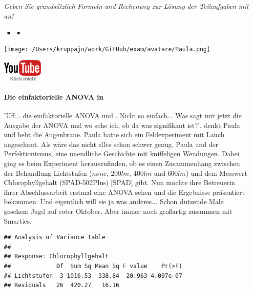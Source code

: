 \documentclass[a4paper, 9pt]{scrartcl}\usepackage[]{graphicx}\usepackage[]{xcolor}
\makeatletter
\newenvironment{kframe}{%
 \def\at@end@of@kframe{}%
 \ifinner\ifhmode%
  \def\at@end@of@kframe{\end{minipage}}%
  \begin{minipage}{\columnwidth}%
 \fi\fi%
 \def\FrameCommand##1{\hskip\@totalleftmargin \hskip-\fboxsep
 \colorbox{shadecolor}{##1}\hskip-\fboxsep
     \hskip-\linewidth \hskip-\@totalleftmargin \hskip\columnwidth}%
 \MakeFramed {\advance\hsize-\width
   \@totalleftmargin\z@ \linewidth\hsize
   \@setminipage}}%
 {\par\unskip\endMakeFramed%
 \at@end@of@kframe}
\newenvironment{knitrout}{}{} %
\makeatother
\begin{document}
\textit{Geben Sie grundsätzlich Formeln und Rechenweg zur Lösung der Teilaufgaben mit an!} \\[1Ex]
 

 
\ifcollection
\begin{flushright}
\tiny\vspace{-3Ex}
\textbf{\examinhaltstart}
\exammodulemathstat $\;\bullet$
\exammodulestat $\;\bullet$
\exammodulestatbbv
\vspace{-4Ex}
\end{flushright}
\begin{minipage}[t]{0.5\textwidth}
\texttt{[image: /Users/kruppajo/work/GitHub/exam/avatare/Paula.png]}
\end{minipage}
\begin{minipage}[t]{0.5\textwidth}
\hfill
\href{https://youtu.be/UOzpeBYWgVQ}{\includegraphics[width = 2cm]{img/youtube}}
\end{minipage}
\vspace{-3Ex}
\fi



\ifcollection
\paragraph{Die einfaktorielle ANOVA in \Rlogo}
\fi

'Uff... die einfaktorielle ANOVA und \Rlogo. Nicht so einfach... Was sagt mir jetzt die Ausgabe der ANOVA und wo sehe ich, ob da was signifikant ist?', denkt Paula und hebt die Augenbraue. Paula hatte sich ein Feldexperiment mit Lauch angeschaut. Als wäre das nicht alles schon schwer genug. Paula und der Perfektionismus, eine unendliche Geschichte mit kniffeligen Wendungen. Dabei ging es beim Experiment herauszufinden, ob es einen Zusammenhang zwischen der Behandlung Lichtstufen ($none$, $200lm$, $400lm$ und $600lm$) und dem Messwert Chlorophyllgehalt (SPAD-502Plus) [SPAD] gibt. Nun möchte ihre Betreuerin ihrer Abschlussarbeit erstmal eine ANOVA sehen und die Ergebnisse präsentiert bekommen. Und eigentlich will sie ja was anderes... Schon dutzende Male gesehen: Jagd auf roter Oktober. Aber immer noch großartig zusammen mit Smarties.

\begin{knitrout}
\color{fgcolor}\begin{kframe}
\begin{verbatim}
## Analysis of Variance Table
## 
## Response: Chlorophyllgehalt
##             Df  Sum Sq Mean Sq F value    Pr(>F)
## Lichtstufen  3 1016.53  338.84  20.963 4.097e-07
## Residuals   26  420.27   16.16
\end{verbatim}
\end{kframe}
\end{knitrout}
\end{document}
